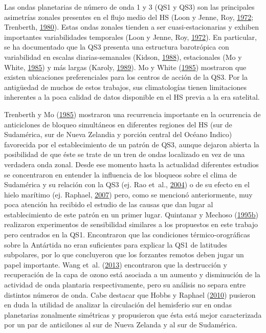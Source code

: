 \documentclass[spanish,a4paper,12pt,oneside]{book}
\begin{document}
Las ondas planetarias de número de onda 1 y 3 (QS1 y QS3) son las
principales asimetrías zonales presentes en el flujo medio del HS (Loon
y Jenne, Roy, \protect\hyperlink{ref-Loon1972}{1972}; Trenberth,
\protect\hyperlink{ref-Trenberth1980a}{1980}). Estas ondas zonales
tienden a ser cuasi-estacionarias y exhiben importantes variabilidades
temporales (Loon y Jenne, Roy, \protect\hyperlink{ref-Loon1972}{1972}).
En particular, se ha documentado que la QS3 presenta una estructura
barotrópica con variabilidad en escalas diarias-semanales (Kidson,
\protect\hyperlink{ref-Kidson1988}{1988}), estacionales (Mo y White,
\protect\hyperlink{ref-Mo1985}{1985}) y más largas (Karoly,
\protect\hyperlink{ref-Karoly1989}{1989}). Mo y White
(\protect\hyperlink{ref-Mo1985}{1985}) mostraron que existen ubicaciones
preferenciales para los centros de acción de la QS3. Por la antigüedad
de muchos de estos trabajos, sus climatologías tienen limitaciones
inherentes a la poca calidad de datos disponible en el HS previa a la
era satelital.

Trenberth y Mo (\protect\hyperlink{ref-Trenberth1985}{1985}) mostraron
una recurrencia importante en la ocurrencia de anticiclones de bloqueo
simultáneos en diferentes regiones del HS (sur de Sudamérica, sur de
Nueva Zelandia y porción central del Océano Indico) favorecida por el
establecimiento de un patrón de QS3, aunque dejaron abierta la
posibilidad de que éste se trate de un tren de ondas localizado en vez
de una verdadera onda zonal. Desde ese momento hasta la actualidad
diferentes estudios se concentraron en entender la influencia de los
bloqueos sobre el clima de Sudamérica y su relación con la QS3 (ej. Rao
et~al., \protect\hyperlink{ref-Rao2004}{2004}) o de su efecto en el
hielo marítimo (ej. Raphael, \protect\hyperlink{ref-Raphael2007}{2007})
pero, como se mencionó anteriormente, muy poca atención ha recibido el
estudio de las causas que dan lugar al establecimiento de este patrón en
un primer lugar. Quintanar y Mechoso
(\protect\hyperlink{ref-Quintanar1995}{1995}\protect\hyperlink{ref-Quintanar1995}{b})
realizaron experimentos de sensibilidad similares a los propuestos en
este trabajo pero centrados en la QS1. Encontraron que las condiciones
térmico-orográficas sobre la Antártida no eran suficientes para explicar
la QS1 de latitudes subpolares, por lo que concluyeron que los forzantes
remotos deben jugar un papel importante. Wang et~al.
(\protect\hyperlink{ref-Wang2013}{2013}) encontraron que la destrucción
y recuperación de la capa de ozono está asociada a un aumento y
disminución de la actividad de onda plantaria respectivamente, pero su
análisis no separa entre distintos números de onda. Cabe destacar que
Hobbs y Raphael (\protect\hyperlink{ref-Hobbs2010}{2010}) pusieron en
duda la utilidad de analizar la circulación del hemisferio sur en ondas
planetarias zonalmente simétricas y propusieron que ésta está mejor
caracterizada por un par de anticilones al sur de Nueva Zelanda y al sur
de Sudamérica.
\end{document}
